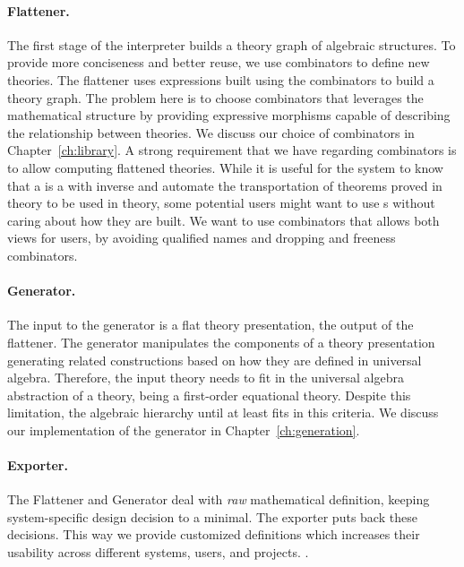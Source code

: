 \paragraph{Flattener.} The first stage of the interpreter builds a theory graph of algebraic structures. To provide more conciseness and better reuse, we use combinators to define new theories. The flattener uses expressions built using the combinators to build a theory graph. The problem here is to choose combinators that leverages the mathematical structure by providing expressive morphisms capable of describing the relationship between theories. We discuss our choice of combinators in Chapter~\ref{ch:library}. A strong requirement that we have regarding combinators is to allow computing flattened theories. While it is useful for the system to know that a  is a  with inverse and automate the transportation of theorems proved in  theory to be used in  theory, some potential users might want to use s without caring about how they are built. We want to use combinators that allows both views for users, by avoiding qualified names and dropping and freeness combinators.

\paragraph{Generator.} The input to the generator is a flat theory presentation, the output of the flattener. The generator manipulates the components of a theory presentation generating related constructions based on how they are defined in universal algebra. Therefore, the input theory needs to fit in the universal algebra abstraction of a theory, being a first-order equational theory. Despite this limitation, the algebraic hierarchy until at least  fits in this criteria. 
We discuss our implementation of the generator in Chapter~\ref{ch:generation}. 

\paragraph{Exporter.} The Flattener and Generator deal with \emph{raw} mathematical definition, keeping system-specific design decision to a minimal. The exporter puts back these decisions. This way we provide customized definitions which increases their usability across different systems, users, and projects. . 


